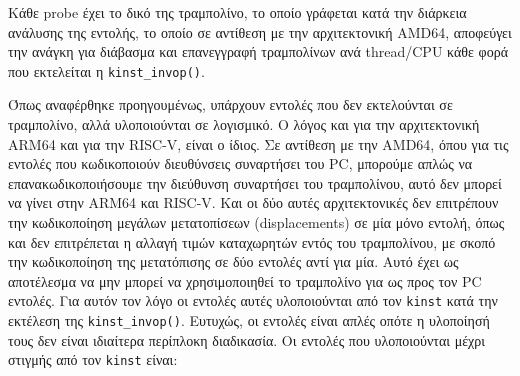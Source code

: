 \documentclass[12pt]{article}
\begin{document}
Κάθε probe έχει το δικό της τραμπολίνο, το οποίο γράφεται κατά την διάρκεια
ανάλυσης της εντολής, το οποίο σε αντίθεση με την αρχιτεκτονική AMD64,
αποφεύγει την ανάγκη για διάβασμα και επανεγγραφή τραμπολίνων ανά thread/CPU
κάθε φορά που εκτελείται η \lstinline{kinst_invop()}.

Όπως αναφέρθηκε προηγουμένως, υπάρχουν εντολές που δεν εκτελούνται σε
τραμπολίνο, αλλά υλοποιούνται σε λογισμικό. Ο λόγος και για την αρχιτεκτονική
ARM64 και για την RISC-V, είναι ο ίδιος. Σε αντίθεση με την AMD64, όπου για τις
εντολές που κωδικοποιούν διευθύνσεις συναρτήσει του PC, μπορούμε απλώς να
επανακωδικοποιήσουμε την διεύθυνση συναρτήσει του τραμπολίνου, αυτό δεν μπορεί
να γίνει στην ARM64 και RISC-V. Και οι δύο αυτές αρχιτεκτονικές δεν επιτρέπουν
την κωδικοποίηση μεγάλων μετατοπίσεων (displacements) σε μία μόνο εντολή, όπως
και δεν επιτρέπεται η αλλαγή τιμών καταχωρητών εντός του τραμπολίνου, με σκοπό
την κωδικοποίηση της μετατόπισης σε δύο εντολές αντί για μία. Αυτό έχει ως
αποτέλεσμα να μην μπορεί να χρησιμοποιηθεί το τραμπολίνο για ως προς τον PC
εντολές. Για αυτόν τον λόγο οι εντολές αυτές υλοποιούνται από τον
\lstinline{kinst} κατά την εκτέλεση της \lstinline{kinst_invop()}. Ευτυχώς, οι
εντολές είναι απλές οπότε η υλοποίησή τους δεν είναι ιδιαίτερα περίπλοκη
διαδικασία. Οι εντολές \cite{riscvisa} \cite{armisa} που υλοποιούνται μέχρι
στιγμής από τον \lstinline{kinst} είναι:
\end{document}
